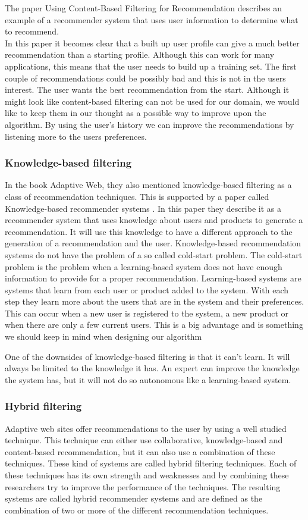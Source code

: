 \documentclass[]{article}
\begin{document}
The paper Using Content-Based Filtering for Recommendation \cite{van2000using} describes an example of a recommender system that uses user information to determine what to recommend.\\
In this paper it becomes clear that a built up user profile can give a much better recommendation than a starting profile.
Although this can work for many applications, this means that the user needs to build up a training set.
The first couple of recommendations could be possibly bad and this is not in the users interest.
The user wants the best recommendation from the start.
Although it might look like content-based filtering can not be used for our domain, we would like to keep them in our thought as a possible way to improve upon the algorithm.
By using the user's history we can improve the recommendations by listening more to the users preferences.

\subsubsection{Knowledge-based filtering}
In the book Adaptive Web, they also mentioned knowledge-based filtering as a class of recommendation techniques.
This is supported by a paper called Knowledge-based recommender systems \cite{burke2000knowledge}.
In this paper they describe it as a recommender system that uses knowledge about users and products to generate a recommendation.
It will use this knowledge to have a different approach to the generation of a recommendation and the user.
Knowledge-based recommendation systems do not have the problem of a so called cold-start problem.
The cold-start problem is the problem when a learning-based system does not have enough information to provide for a proper recommendation.
Learning-based systems are systems that learn from each user or product added to the system.
With each step they learn more about the users that are in the system and their preferences.
This can occur when a new user is registered to the system, a new product or when there are only a few current users.
This is a big advantage and is something we should keep in mind when designing our algorithm

One of the downsides of knowledge-based filtering is that it can't learn.
It will always be limited to the knowledge it has.
An expert can improve the knowledge the system has, but it will not do so autonomous like a learning-based system.

\subsubsection{Hybrid filtering}
Adaptive web sites offer recommendations to the user by using a well studied technique.
This technique can either use collaborative, knowledge-based and content-based recommendation, but it can also use a combination of these techniques.
These kind of systems are called hybrid filtering techniques.
Each of these techniques has its own strength and weaknesses and by combining these researchers try to improve the performance of the techniques.
The resulting systems are called hybrid recommender systems and are defined as the combination of two or more of the different recommendation techniques.
\end{document}
